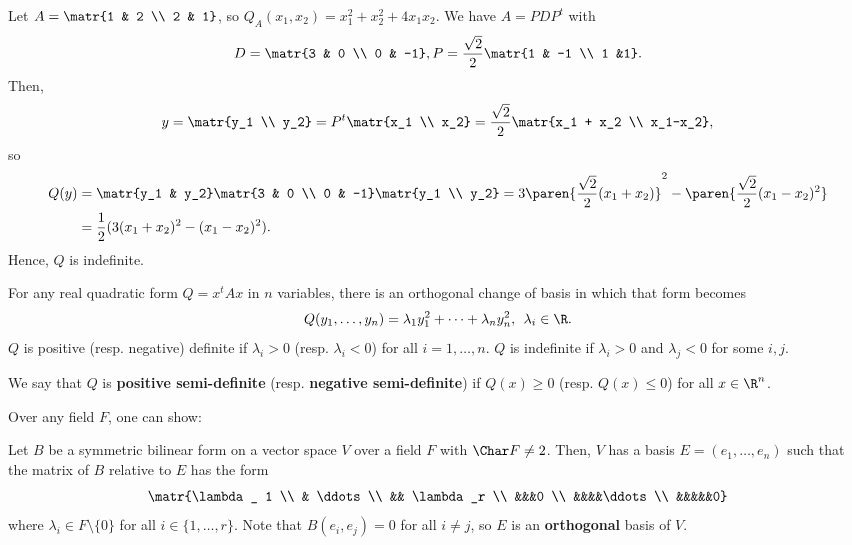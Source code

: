 \begin{ex}
    Let $A = \matr{1 & 2 \\ 2 & 1}$, so $Q_A(x_1,x_2) = x_1^2 + x_2^2 + 4x_1x_2$. We have $A=PDP^t$ with
    $$D = \matr{3 & 0 \\ 0 & -1}, P= \frac{\sqrt 2}{2}\matr{1 & -1 \\ 1 &1}.$$
    Then,
    $$y = \matr{y_1 \\ y_2}= P^t \matr{x_1 \\ x_2} = \frac{\sqrt 2}{2}\matr{x_1 + x_2 \\ x_1-x_2},$$
    so
    \begin{align*}
        Q(y) &= \matr{y_1 & y_2}\matr{3 & 0 \\ 0 & -1}\matr{y_1 \\ y_2}=3 \paren{\frac{\sqrt 2}{2}(x_1+x_2)}^2 - \paren{\frac{\sqrt 2}{2}(x_1-x_2)^2}
        \\ &= \frac{1}2{(3(x_1+x_2)^2 -(x_1-x_2)^2)}.
    \end{align*}
    Hence, $Q$ is indefinite.
\end{ex}

\begin{thm}
    For any real quadratic form $Q = x^tAx$ in $n$ variables, there is an orthogonal change of basis in which that form becomes
    $$Q(y_1,\dots,y_n) = \lambda _1y_1^2 + \cdots + \lambda _ny_n^2,\:\: \lambda _i \in \R.$$
    $Q$ is positive (resp. negative) definite if $\lambda _i >0$ (resp. $\lambda _i < 0$) for all $i=1,\dots,n$. $Q$ is indefinite if $\lambda _i >0$ and $\lambda _j<0$ for some $i,j$.
\end{thm}

\begin{defn}
    We say that $Q$ is \textbf{positive semi-definite} (resp. \textbf{negative semi-definite}) if $Q(x) \geq 0$ (resp. $Q(x) \leq 0$) for all $x \in \R^n$.
\end{defn}

Over any field $F$, one can show:
\begin{thm}
    Let $B$ be a symmetric bilinear form on a vector space $V$ over a field $F$ with $\Char F \neq 2$. Then, $V$ has a basis $E = (e_1,\dots,e_n)$ such that the matrix of $B$ relative to $E$ has the form
    $$\matr{\lambda _ 1 \\ & \ddots \\ && \lambda _r \\ &&&0 \\ &&&&\ddots\\ &&&&&0}$$
    where $\lambda _i \in F \setminus\{0\}$ for all $i\in \{1,\dots,r\}$. Note that $B(e_i,e_j)=0$ for all $i \neq j$, so $E$ is an \textbf{orthogonal} basis of $V$.
\end{thm}

